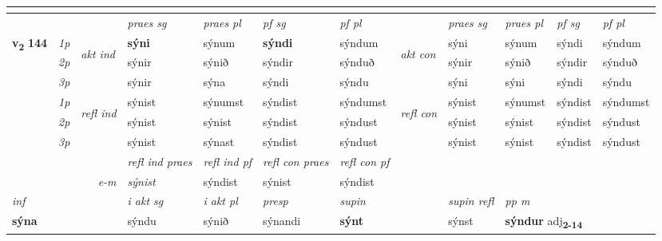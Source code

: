 \begin{longtable}[l]{X>{\footnotesize\itshape}llXXXXlXXXX}
\midrule
  & \\
   \midrule
 & &   & \textit{praes sg}  & \textit{praes pl}    & \textit{ pf sg} & \textit{pf pl} & & \textit{praes sg}  & \textit{praes pl}    & \textit{pf sg} & \textit{pf pl }  \\ \cmidrule{4-7} \cmidrule{9-12}
 \multirow{2}{*}{{{\textbf{v{\textsubscript{2}}} \Large{\textbf{144}}}}}  & 1p & \multirow{3}{*}{\begin{turn}{90}\textit{akt ind}\end{turn}} & \textbf{sýni} & sýnum & \textbf{sýndi} & sýndum & \multirow{3}{*}{\begin{turn}{90}\textit{akt con}\end{turn}} &sýni & sýnum & sýndi & sýndum\\*
 & 2p &  &  sýnir  & sýnið & sýndir & sýnduð & & sýnir & sýnið & sýndir & sýnduð \\*
 & 3p &  & sýnir & sýna & sýndi & sýndu & & sýni & sýni& sýndi & sýndu \\*
\cmidrule{4-7} \cmidrule{9-12}
 & 1p & \multirow{3}{*}{\begin{turn}{90}\textit{refl ind}\end{turn}}  & sýnist & sýnumst & sýndist & sýndumst & \multirow{3}{*}{\begin{turn}{90}\textit{refl con}\end{turn}}  &sýnist & sýnumst & sýndist & sýndumst \\*
 & 2p &  & sýnist & sýnist & sýndist & sýndust & &sýnist & sýnist & sýndist & sýndust \\*
 & 3p  & & sýnist & sýnast & sýndist & sýndust & & sýnist & sýnist& sýndist & sýndust \\*
\cmidrule{4-7} \cmidrule{9-12}

 & && \textit{refl ind praes} & \textit{refl ind pf} & \textit{refl con praes} & \textit{refl con pf} \\*
\multicolumn{3}{r}{\textit{e-m}}& sýnist & sýndist & sýnist & sýndist \\*

\cmidrule{4-7}
   {\textit{inf}} & &  & \textit{i akt sg} & \textit{i akt pl}   & \textit{presp} & \textit{supin} && \textit{supin refl} & \textit{pp m} \\*
  {\textbf{sýna}} & && sýndu  & sýnið   & sýnandi &  \textbf{sýnt} && sýnst & \multicolumn{2}{l}{\textbf{sýndur} adj\textbf{\textsubscript{2-14}}} \\*

\midrule


\end{longtable}
